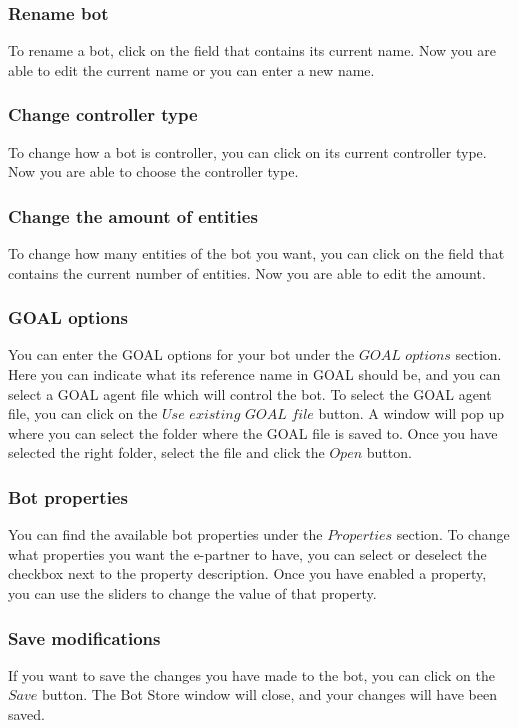 \subsubsection{Rename bot}
To rename a bot, click on the field that contains its current name. Now you are able to edit the current name or you can enter a new name.

\subsubsection{Change controller type}
To change how a bot is controller, you can click on its current controller type. Now you are able to choose the controller type.

\subsubsection{Change the amount of entities}
To change how many entities of the bot you want, you can click on the field that contains the current number of entities. Now you are able to edit the amount.

\subsubsection{GOAL options}
You can enter the GOAL options for your bot under the $GOAL$ $options$ section. Here you can indicate what its reference name in GOAL should be, and you can select a GOAL agent file which will control the bot. To select the GOAL agent file, you can click on the $Use$ $existing$ $GOAL$ $file$ button. A window will pop up where you can select the folder where the GOAL file is saved to. Once you have selected the right folder, select the file and click the $Open$ button.

\subsubsection{Bot properties}
You can find the available bot properties under the $Properties$ section. To change what properties you want the e-partner to have, you can select or deselect the checkbox next to the property description. Once you have enabled a property, you can use the sliders to change the value of that property.

\subsubsection{Save modifications}
If you want to save the changes you have made to the bot, you can click on the $Save$ button. The Bot Store window will close, and your changes will have been saved.

